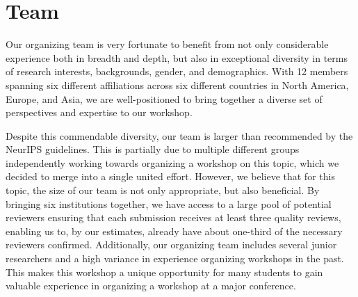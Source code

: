 \documentclass{article}
\begin{document}



% 





\section{Team}

Our organizing team is very fortunate to benefit from not only considerable experience both in breadth and depth, but also in exceptional diversity in terms of research interests, backgrounds, gender, and demographics. With 12 members spanning six different affiliations across six different countries in North America, Europe, and Asia, we are well-positioned to bring together a diverse set of perspectives and expertise to our workshop.

Despite this commendable diversity, our team is larger than recommended by the NeurIPS guidelines. This is partially due to multiple different groups independently working towards organizing a workshop on this topic, which we decided to merge into a single united effort.
However, we believe that for this topic, the size of our team is not only appropriate, but also beneficial. 
By bringing six institutions together, we have access to a large pool of potential reviewers ensuring that each submission receives at least three quality reviews, enabling us to, by our estimates, already have about one-third of the necessary reviewers confirmed.
Additionally, our organizing team includes several junior researchers and a high variance in experience organizing workshops in the past. This makes this workshop a unique opportunity for many students to gain valuable experience in organizing a workshop at a major conference.
\end{document}
